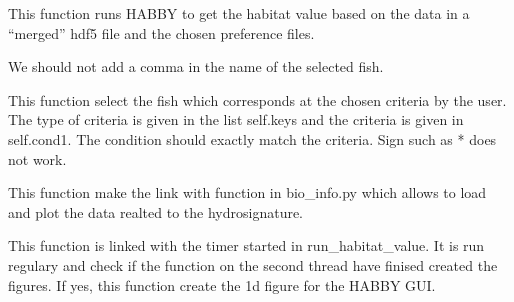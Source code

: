 \documentclass[letterpaper,10pt,english]{sphinxmanual}
\begin{document}
\begin{fulllineitems}
\begin{fulllineitems}
\end{fulllineitems}


\begin{fulllineitems}
\label{\detokenize{index:src_GUI.bio_info_GUI.BioInfo.run_habitat_value}}
This function runs HABBY to get the habitat value based on the data in a ``merged'' hdf5 file and the chosen
preference files.

We should not add a comma in the name of the selected fish.

\end{fulllineitems}


\begin{fulllineitems}
\label{\detokenize{index:src_GUI.bio_info_GUI.BioInfo.select_fish}}
This function select the fish which corresponds at the chosen criteria by the user. The type of criteria
is given in the list self.keys and the criteria is given in self.cond1. The condition should exactly
match the criteria. Sign such as * does not work.

\end{fulllineitems}


\begin{fulllineitems}
\label{\detokenize{index:src_GUI.bio_info_GUI.BioInfo.show_hydrosignature}}
This function make the link with function in bio\_info.py which allows to load and plot the data realted
to the hydrosignature.

\end{fulllineitems}


\begin{fulllineitems}
\label{\detokenize{index:src_GUI.bio_info_GUI.BioInfo.show_image_hab}}
This function is linked with the timer started in run\_habitat\_value. It is run regulary and
check if the function on the second thread have finised created the figures. If yes,
this function create the 1d figure for the HABBY GUI.


\end{fulllineitems}
\end{fulllineitems}
\end{document}
